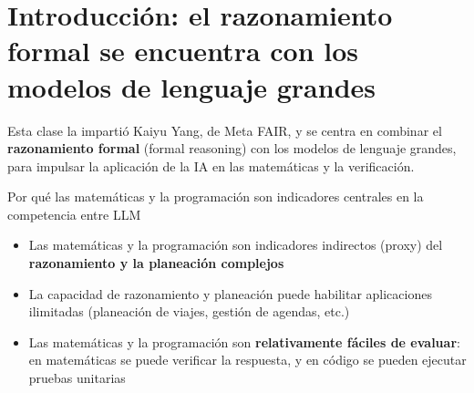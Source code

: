 \section{Introducción: el razonamiento formal se encuentra con los modelos de lenguaje grandes}

Esta clase la impartió Kaiyu Yang, de Meta FAIR, y se centra en combinar el \textbf{razonamiento formal} (formal reasoning) con los modelos de lenguaje grandes, para impulsar la aplicación de la IA en las matemáticas y la verificación.

\begin{knowledgebox}{Por qué las matemáticas y la programación son indicadores centrales en la competencia entre LLM}
\begin{itemize}
    \item Las matemáticas y la programación son indicadores indirectos (proxy) del \textbf{razonamiento y la planeación complejos}
    \item La capacidad de razonamiento y planeación puede habilitar aplicaciones ilimitadas (planeación de viajes, gestión de agendas, etc.)
    \item Las matemáticas y la programación son \textbf{relativamente fáciles de evaluar}: en matemáticas se puede verificar la respuesta, y en código se pueden ejecutar pruebas unitarias
\end{itemize}
\end{knowledgebox}

